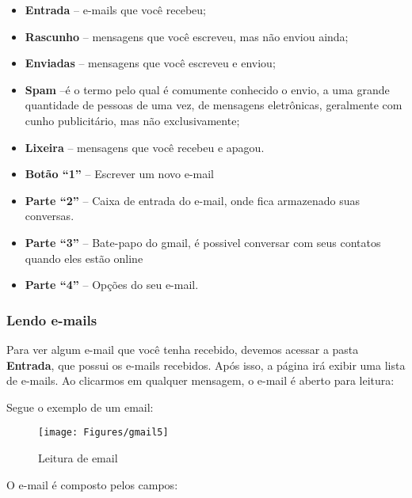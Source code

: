 \documentclass[hidelinks,12pt]{article}
\begin{document}
		\begin{itemize}
			\item \textbf{Entrada} – e-mails que você recebeu;

			\item \textbf{Rascunho} – mensagens que você escreveu, mas não enviou ainda;

			\item \textbf{Enviadas} – mensagens que você escreveu e enviou;

			\item \textbf{Spam} –é o termo pelo qual é comumente conhecido o envio, a uma grande quantidade de pessoas de uma vez, de mensagens eletrônicas, geralmente com cunho publicitário, mas não exclusivamente;

			\item \textbf{Lixeira} – mensagens que você recebeu e apagou.

			\item \textbf{Botão “1”} – Escrever um novo e-mail

			\item \textbf{Parte “2”} – Caixa de entrada do e-mail, onde fica armazenado suas conversas.

			\item \textbf{Parte “3”} – Bate-papo do gmail, é possivel conversar com seus contatos quando eles estão online

			\item \textbf{Parte “4”} – Opções do seu e-mail.

		\end{itemize}


		\subsubsection{Lendo e-mails}

		Para ver algum e-mail que você tenha recebido, devemos acessar a pasta \textbf{Entrada}, que possui os e-mails recebidos. Após isso, a página irá exibir uma lista de e-mails. Ao clicarmos em qualquer mensagem, o e-mail é aberto para leitura:

		Segue o exemplo de um email:

		\begin{figure}[!h]
			\centering
			\texttt{[image: Figures/gmail5]}
			\label{fig:gmail5}
			\caption{Leitura de email}
		\end{figure}

		O e-mail é composto pelos campos:
\end{document}
